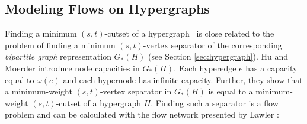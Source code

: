 
\subsection{Modeling Flows on Hypergraphs}
\label{sec:related_lawler}

Finding a minimum $(s,t)$-cutset of a hypergraph \HypergraphDef~is close related to the problem of finding
a minimum $(s,t)$-vertex separator of the corresponding \emph{bipartite graph} representation $G_*(H)$ (see Section \ref{sec:hypergraph}).
Hu and Moerder \cite{HuMoerder85} introduce node capacities in $G_*(H)$. Each hyperedge
$e$ has a capacity equal to $\omega(e)$ and each hypernode has infinite capacity. 
Further, they show that a minimum-weight $(s,t)$-vertex separator in $G_*(H)$
is equal to a minimum-weight $(s,t)$-cutset of a hypergraph $H$. 
Finding such a separator is a flow problem and can be calculated with the flow network  
presented by Lawler \cite{lawler1973}:

